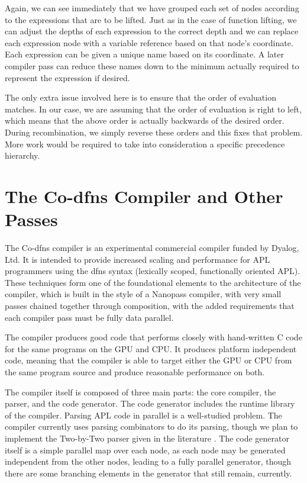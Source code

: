 \documentclass[numbers,preprint]{sigplanconf}
\begin{document}
Again, we can see immediately that we have grouped each set of nodes
according to the expressions that are to be lifted. Just as in the
case of function lifting, we can adjust the depths of each expression
to the correct depth and we can replace each expression node with a
variable reference based on that node’s coordinate. Each expression
can be given a unique name based on its coordinate. A later compiler
pass can reduce these names down to the minimum actually required to
represent the expression if desired.

The only extra issue involved here is to ensure that the order of
evaluation matches. In our case, we are assuming that the order of
evaluation is right to left, which means that the above order is
actually backwards of the desired order. During recombination, we
simply reverse these orders and this fixes that problem. More work
would be required to take into consideration a specific precedence
hierarchy.

\section{The Co-dfns Compiler and Other Passes}

The Co-dfns compiler is an experimental commercial compiler funded by 
Dyalog, Ltd. \cite{hsu2014co,hsu2015accelerating}
It is intended to provide increased scaling and performance
for APL programmers using the dfns syntax (lexically scoped, functionally 
oriented APL). These techniques form one of the foundational elements to 
the architecture of the compiler, which is built in the style of a Nanopass 
\cite{keep2013nanopass}
compiler, with very small passes chained together through composition, with 
the added requirements that each compiler pass must be fully data parallel. 

The compiler produces good code that performs closely with hand-written 
C code for the same programs on the GPU and CPU. It produces platform 
independent code, meaning that the compiler is able to target either the 
GPU or CPU from the same program source and produce reasonable performance 
on both. 

The compiler itself is composed of three main parts: the core compiler, 
the parser, and the code generator. The code generator includes the runtime 
library of the compiler. Parsing APL code in parallel is a well-studied 
problem. The compiler currently uses parsing combinators to do its parsing, 
though we plan to implement the Two-by-Two parser given in the literature
\cite{bunda1984apl}. 
The code generator itself is a simple parallel map over each node, as 
each node may be generated independent from the other nodes, leading to a 
fully parallel generator, though there are some branching elements in the 
generator that still remain, currently. 
\end{document}
